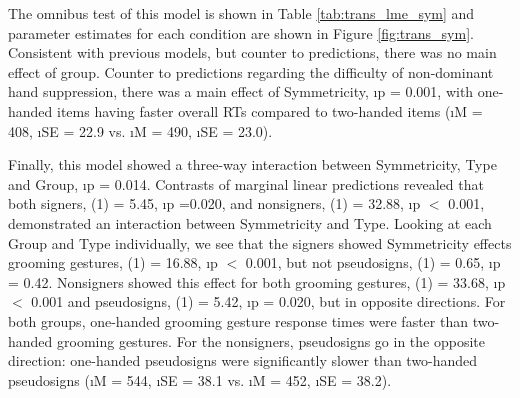             The omnibus test of this model is shown in Table \ref{tab:trans_lme_sym} and parameter estimates for each condition are shown in Figure \ref{fig:trans_sym}. Consistent with previous models, but counter to predictions, there was no main effect of group. Counter to predictions regarding the difficulty of non-dominant hand suppression, there was a main effect of Symmetricity, \i{p} = 0.001, with one-handed items having faster overall RTs compared to two-handed items (\i{M} = 408, \i{SE} = 22.9 vs. \i{M} = 490, \i{SE} = 23.0). \par
            Finally, this model showed a three-way interaction between Symmetricity, Type and Group, \i{p} = 0.014. Contrasts of marginal linear predictions revealed that both signers, \chsq(1) = 5.45, \i{p} =0.020, and nonsigners, \chsq(1) = 32.88, \i{p} $<$ 0.001, demonstrated an interaction between Symmetricity and Type. Looking at each Group and Type individually, we see that the signers showed Symmetricity effects grooming gestures, \chsq(1) = 16.88, \i{p} $<$ 0.001, but not pseudosigns, \chsq(1) = 0.65, \i{p} = 0.42. Nonsigners showed this effect for both grooming gestures, \chsq(1) = 33.68, \i{p} $<$ 0.001 and pseudosigns, \chsq(1) = 5.42, \i{p} = 0.020, but in opposite directions. For both groups, one-handed grooming gesture response times were faster than two-handed grooming gestures. For the nonsigners, pseudosigns go in the opposite direction: one-handed pseudosigns were significantly slower than two-handed pseudosigns (\i{M} = 544, \i{SE} = 38.1 vs. \i{M} = 452, \i{SE} = 38.2).\par
